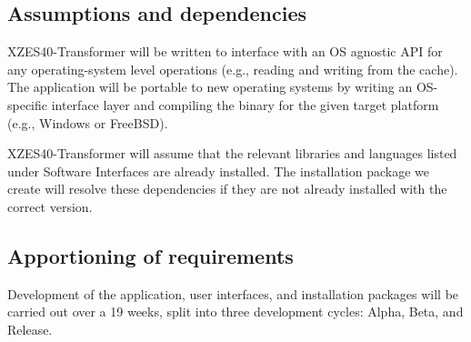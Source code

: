 \subsection{Assumptions and dependencies}

XZES40-Transformer will be written to interface with an OS agnostic API for any operating-system level operations (e.g., reading and writing from the cache).
The application will be portable to new operating systems by writing an OS-specific interface layer and compiling the binary for the given target platform (e.g., Windows or FreeBSD).

XZES40-Transformer will assume that the relevant libraries and languages listed under Software Interfaces are already installed.
The installation package we create will resolve these dependencies if they are not already installed with the correct version.


\subsection{Apportioning of requirements}

Development of the application, user interfaces, and installation packages will be carried out over a 19 weeks, split into three development cycles: Alpha, Beta, and Release.

